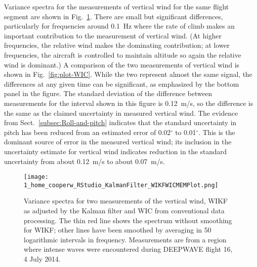 \documentclass[12pt,twoside,english,12pt,twoside,english]{article}\usepackage[]{graphicx}\usepackage[]{color}
\let\OrgIndex\index
\renewcommand*{\index}[1]{\OrgIndex{#1}}
\begin{document}
Variance spectra for the measurements
of vertical wind for the same flight segment are shown in Fig.~\ref{fig:Variance-spectra-WI}.
There are small but significant differences, particularly for frequencies
around 0.1~Hz where the rate of climb makes an important contribution
to the measurement of vertical wind. (At higher frequencies, the relative
wind makes the dominating contribution; at lower frequencies, the
aircraft is controlled to maintain altitude so again the relative
wind is dominant.)
A comparison of the two measurements of vertical wind is shown in
Fig.~\ref{fig:plot-WIC}.
While the two represent almost the same signal, the differences at
any given time can be significant, as emphasized by the bottom panel
in the figure. The standard deviation
of the difference between measurements for the interval shown in this
figure is 0.12~m/s,
so the difference is the same as the claimed uncertainty in measured
vertical wind. The evidence from Sect.~\ref{subsec:Roll-and-pitch}
indicates that the standard uncertainty in pitch has been reduced
from an estimated error of 0.02$^{\circ}$ to 0.01$^{\circ}$. This
is the dominant source of error in the measured vertical wind; its
inclusion in the uncertainty estimate for vertical wind indicates
reduction in the standard uncertainty from about 0.12~m/s to about
0.07~m/s.

\begin{figure}
\begin{centering}
\texttt{[image: 1\_home\_cooperw\_RStudio\_KalmanFilter\_WIKFWICMEMPlot.png]}
\par\end{centering}
\caption[Variance spectra for two measurements of the vertical wind, WIKF as adjusted by the Kalman filter and WIC from conventional data processing.]{Variance spectra for two measurements of the vertical wind, WIKF as adjusted by the Kalman filter and WIC from conventional data processing. The thin red line shows the spectrum without smoothing for WIKF; other lines have been smoothed by averaging in 50 logarithmic intervals in frequency. Measurements are from a region where intense waves were encountered during DEEPWAVE flight 16, 4 July 2014. \label{fig:Variance-spectra-WI}} 

\end{figure}
\end{document}
